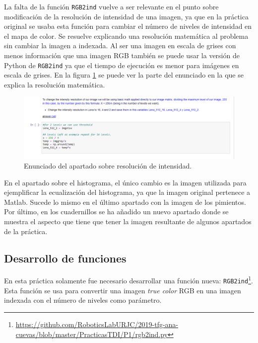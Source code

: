 La falta de la función \texttt{RGB2ind} vuelve a ser relevante en el punto sobre modificación de la resolución de intensidad de una imagen, ya que en la práctica original se usaba esta función para cambiar el número de niveles de intensidad en el mapa de color. Se resuelve explicando una resolución matemática al problema sin cambiar la imagen a indexada. Al ser una imagen en escala de grises con menos información que una imagen RGB también se puede usar la versión de Python de \texttt{RGB2ind} ya que el tiempo de ejecución es menor para imágenes en escala de grises. En la figura \ref{resmatematica} se puede ver la parte del enunciado en la que se explica la resolución matemática. 

\begin{figure}[h]
\centering
\includegraphics[width=1\textwidth]{imagenes/resolucionmatematica}
\caption{Enunciado del apartado sobre resolución de intensidad.}
\label{resmatematica}
\end{figure}

En el apartado sobre el histograma, el único cambio es la imagen utilizada para ejemplificar la ecualización del histograma, ya que la imagen original pertenece a Matlab. Sucede lo mismo en el último apartado con la imagen de los pimientos.\\

Por último, en los cuadernillos se ha añadido un nuevo apartado donde se muestra el aspecto que tiene que tener la imagen resultante de algunos apartados de la práctica.

\subsection{Desarrollo de funciones}

En esta práctica solamente fue necesario desarrollar una función nueva: \texttt{RGB2ind}\footnote{\url{https://github.com/RoboticsLabURJC/2019-tfg-ana-cuevas/blob/master/PracticasTDI/P1/rgb2ind.py}}. Esta función se usa para convertir una imagen \emph{true color} RGB en una imagen indexada con el número de niveles como parámetro. \\

